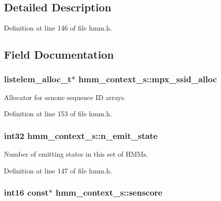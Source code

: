 \subsection{Detailed Description}


Definition at line 146 of file hmm.\+h.



\subsection{Field Documentation}
\subsubsection[{mpx\+\_\+ssid\+\_\+alloc}]{\setlength{\rightskip}{0pt plus 5cm}listelem\+\_\+alloc\+\_\+t$\ast$ hmm\+\_\+context\+\_\+s\+::mpx\+\_\+ssid\+\_\+alloc}\label{structhmm__context__s_a63486d186a984a87d060064e65fab564}


Allocator for senone sequence I\+D arrays. 



Definition at line 153 of file hmm.\+h.

\subsubsection[{n\+\_\+emit\+\_\+state}]{\setlength{\rightskip}{0pt plus 5cm}int32 hmm\+\_\+context\+\_\+s\+::n\+\_\+emit\+\_\+state}\label{structhmm__context__s_a27ba4c5db11110bddf240dd52ed36084}


Number of emitting states in this set of H\+M\+Ms. 



Definition at line 147 of file hmm.\+h.

\subsubsection[{senscore}]{\setlength{\rightskip}{0pt plus 5cm}int16 const$\ast$ hmm\+\_\+context\+\_\+s\+::senscore}\label{structhmm__context__s_a1cca9eb94bc20d9c5e60f2da18074397}


